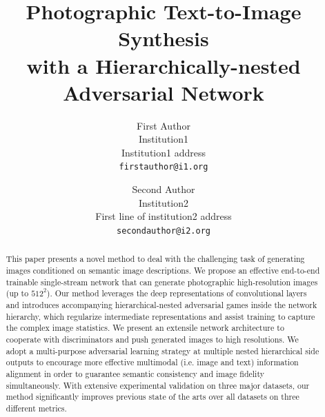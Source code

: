 \documentclass[10pt,twocolumn,letterpaper]{article}
\begin{document}
\title{Photographic Text-to-Image Synthesis \\ with a Hierarchically-nested Adversarial Network}

\author{First Author\\
Institution1\\
Institution1 address\\
{\tt\small firstauthor@i1.org}
\and
Second Author\\
Institution2\\
First line of institution2 address\\
{\tt\small secondauthor@i2.org}
}

\maketitle

\begin{abstract}
This paper presents a novel method to deal with the challenging task of generating images conditioned on semantic image descriptions. We propose an effective end-to-end trainable single-stream network that can generate photographic high-resolution images (up to $512^2$). Our method leverages the deep representations of convolutional layers and introduces accompanying hierarchical-nested adversarial games inside the network hierarchy, which regularize intermediate representations and assist training to capture the complex image statistics. We present an extensile network architecture to cooperate with discriminators and push generated images to high resolutions. 
We adopt a multi-purpose adversarial learning strategy at multiple nested hierarchical side outputs to encourage more effective multimodal (i.e. image and text) information alignment in order to guarantee semantic consistency and image fidelity simultaneously. 
With extensive experimental validation on three major datasets, our method significantly improves previous state of the arts over all datasets on three different metrics. 

\end{abstract}


\end{document}
